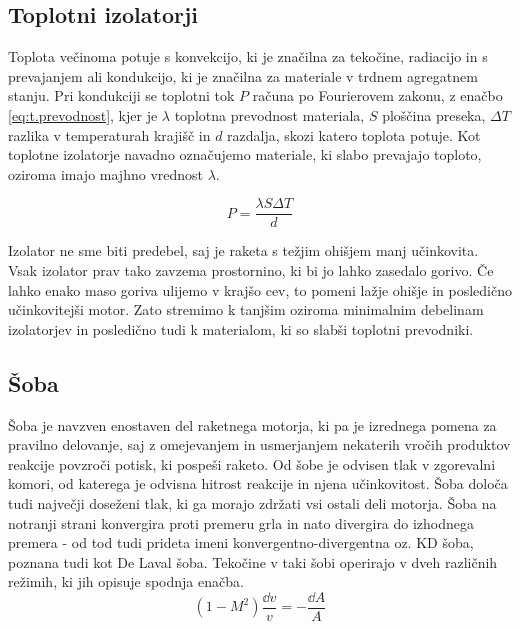 \documentclass[titlepage, a4paper, twoside, final, 12pt]{article}
\begin{document}
			\subsection{Toplotni izolatorji} \label{tp_izo}
			Toplota večinoma potuje s konvekcijo, ki je značilna za tekočine, radiacijo in s prevajanjem ali kondukcijo, ki je značilna za materiale v trdnem agregatnem stanju.
			Pri kondukciji se toplotni tok $P$ računa po Fourierovem zakonu, z enačbo \ref{eq:t.prevodnost}, kjer je $\lambda$ toplotna prevodnost materiala, $S$ ploščina preseka, $\Delta T$ razlika
			v temperaturah krajišč in $d$ razdalja, skozi katero toplota potuje.\cite{Thermal_Conductivity}
			Kot toplotne izolatorje navadno označujemo materiale, ki slabo prevajajo toploto, oziroma imajo majhno vrednost $\lambda$.

			\begin{equation} \label{eq:t.prevodnost}
				P = \frac{\lambda S \Delta T}{d}
			\end{equation}

			Izolator ne sme biti predebel, saj je raketa s težjim ohišjem manj učinkovita. 
			Vsak izolator prav tako zavzema prostornino, ki bi jo lahko zasedalo gorivo. Če lahko enako maso goriva ulijemo v krajšo cev, to pomeni lažje ohišje in posledično učinkovitejši motor.
			Zato stremimo k tanjšim oziroma minimalnim debelinam izolatorjev in posledično tudi k materialom, ki so slabši toplotni prevodniki.

			
			\subsection{Šoba} \label{soba}
			Šoba je navzven enostaven del raketnega motorja, ki pa je izrednega pomena za pravilno delovanje, saj z omejevanjem in usmerjanjem nekaterih vročih produktov
			reakcije povzroči potisk, ki pospeši raketo.
			Od šobe je odvisen tlak v zgorevalni komori, od katerega je odvisna hitrost reakcije in njena učinkovitost. Šoba določa tudi največji doseženi tlak, ki ga morajo zdržati vsi ostali deli motorja.
			Šoba na notranji strani konvergira proti premeru grla
			in nato divergira do izhodnega premera - od tod tudi prideta imeni konvergentno-divergentna oz. KD šoba, poznana tudi kot De Laval šoba.
			Tekočine v taki šobi operirajo v dveh različnih režimih, ki jih opisuje spodnja enačba.\cite{nasa:nozzle_design}
			\begin{equation} \label{eq:šoba-vA}
				(1 - M^2) \frac{\dd v}{v} = - \frac{\dd A}{A}
			\end{equation}
\end{document}
